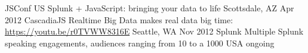 \begin{cvtalks}
  \cvtalk
    {JSConf US}
    {Splunk + JavaScript: bringing your data to life}
    {Scottsdale, AZ}
    {Apr 2012}
  \cvtalk
    {CascadiaJS}
    {Realtime Big Data makes real data big time: \href{https://youtu.be/r0TVWW8316E}{https://youtu.be/r0TVWW8316E}}
    {Seattle, WA}
    {Nov 2012}
  \cvtalk
    {Splunk}
    {Multiple Splunk speaking engagements, audiences ranging from 10 to a 1000}
    {USA}
    {ongoing}
\end{cvtalks}
